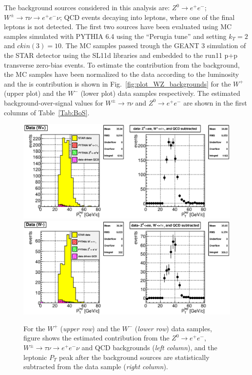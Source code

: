 \documentclass[12pt]{article}
\begin{document}
The background sources considered in this analysis are: 
$Z^{0} \rightarrow e^+e^-$; 
$W^{\pm} \rightarrow \tau\nu \rightarrow e^+e^-\nu$; 
QCD events decaying into leptons, 
where one of the final leptons is not detected.
The first two sources have been evaluated using MC samples simulated with PYTHIA 6.4 using the ``Perugia tune'' and setting $k_{T}=2$ and $ckin(3)=10$. The MC samples passed trough the GEANT 3 simulation of the STAR detector using the SL11d libraries and embedded to the run11 p+p transverse zero-bias events. To estimate the contribution from the background, the MC samples have been normalized to the data according to the luminosity and the is contribution is shown in Fig.~\ref{fig:plot_WZ_backgrounds} for the $W^{+}$ (upper plot) and the $W^{-}$ (lower plot) data samples respectively. The estimated background-over-signal values for $W^{\pm} \rightarrow \tau\nu$ and $Z^{0} \rightarrow e^+e^-$ are shown in the first columns of Table~\ref{Tab:BoS}. 

\begin{figure}[htbp]
\begin{center}
\includegraphics[scale=0.8]{images/backgrounds/plot_5}
\includegraphics[scale=0.8]{images/backgrounds/plot_7}
\end{center}
\caption{For the $W^{+}$ ({\it upper row}) and the $W^{-}$ ({\it lower row}) data samples, figure shows the estimated contribution from the $Z^{0} \rightarrow e^+e^-$, $W^{\pm} \rightarrow \tau\nu \rightarrow e^+e^-\nu$ and QCD backgrounds ({\it left column}), and the leptonic $P_{T}$ peak after the background sources are statistically subtracted from the data sample ({\it right column}).}
\label{fig:plot_QCD_bkd_pt25} 
\end{figure}
\end{document}
